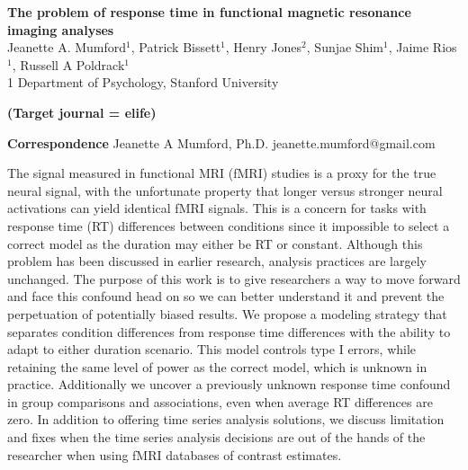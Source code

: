 \documentclass[titlepage,12pt] {article}
\begin{document}
\begin{titlepage}
\begin{center}
{\large\textbf{The problem of response time in functional magnetic resonance imaging analyses
}}\\
{Jeanette A. Mumford$^1$, Patrick Bissett$^1$, Henry Jones$^2$, Sunjae Shim$^1$, Jaime Rios$^1$, Russell A Poldrack$^1$\\
  \small{1} Department of Psychology, Stanford University }
\end{center}


\textbf{(Target journal = elife)}

\vspace{2.8in}
\begin{singlespace}
  \hspace{0.1in}\newline
\textbf{Correspondence}\newline 
Jeanette A Mumford, Ph.D. \newline 
jeanette.mumford@gmail.com \newline
\end{singlespace}

\newpage
{}


The signal measured in functional MRI (fMRI) studies is a proxy for the true neural signal, with the unfortunate property that 
longer versus stronger neural activations can yield identical fMRI signals. This is a concern for tasks with response time (RT) differences between conditions since it impossible to select a correct model as the duration may either be RT or constant.  Although this problem has been discussed in earlier research, analysis practices are largely unchanged.  The purpose of this work is to give researchers a way to move forward and face this confound head on so we can better understand it and prevent the perpetuation of potentially biased results.  We propose a modeling strategy that separates condition differences from response time differences with the ability to adapt to either duration scenario.  This model controls type I errors, while retaining the same level of power as the correct model, which is unknown in practice.  Additionally we uncover a previously unknown response time confound in group comparisons and associations, even when average RT differences are zero.  In addition to offering time series analysis solutions, we discuss limitation and fixes when the time series analysis decisions are out of the hands of the researcher when using fMRI databases of contrast estimates.


\vspace{.1in}


\end{titlepage}
\end{document}
